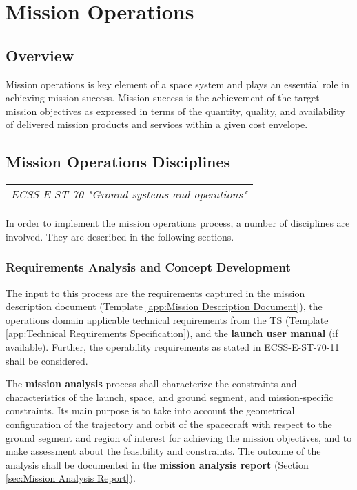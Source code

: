 \chapter{Mission Operations}
\label{chap:Mission Operations}

\section{Overview}

Mission operations is key element of a space system and plays an essential role in achieving mission success. Mission success is the achievement of the target mission objectives as expressed in terms of the quantity, quality, and availability of delivered mission products and services within a given cost envelope.

\section{Mission Operations Disciplines}

\begin{tabular}{l}
\textit{ECSS-E-ST-70 "Ground systems and operations" \cite{ECSS-E-ST-70}}
\end{tabular}

In order to implement the mission operations process, a number of disciplines are involved. They are described in the following sections.

\subsection{Requirements Analysis and Concept Development}

The input to this process are the requirements captured in the mission description document (Template \ref{app:Mission Description Document}), the operations domain applicable technical requirements from the TS (Template \ref{app:Technical Requirements Specification}), and the \textbf{launch user manual} (if available). Further, the operability requirements as stated in ECSS-E-ST-70-11 \cite{ECSS-E-ST-70-11} shall be considered.

The \textbf{mission analysis} process shall characterize the constraints and characteristics of the launch, space, and ground segment, and mission-specific constraints. Its main purpose is to take into account the geometrical configuration of the trajectory and orbit of the spacecraft with respect to the ground segment and region of interest for achieving the mission objectives, and to make assessment about the feasibility and constraints. The outcome of the analysis shall be documented in the \textbf{mission analysis report} (Section \ref{sec:Mission Analysis Report}).

